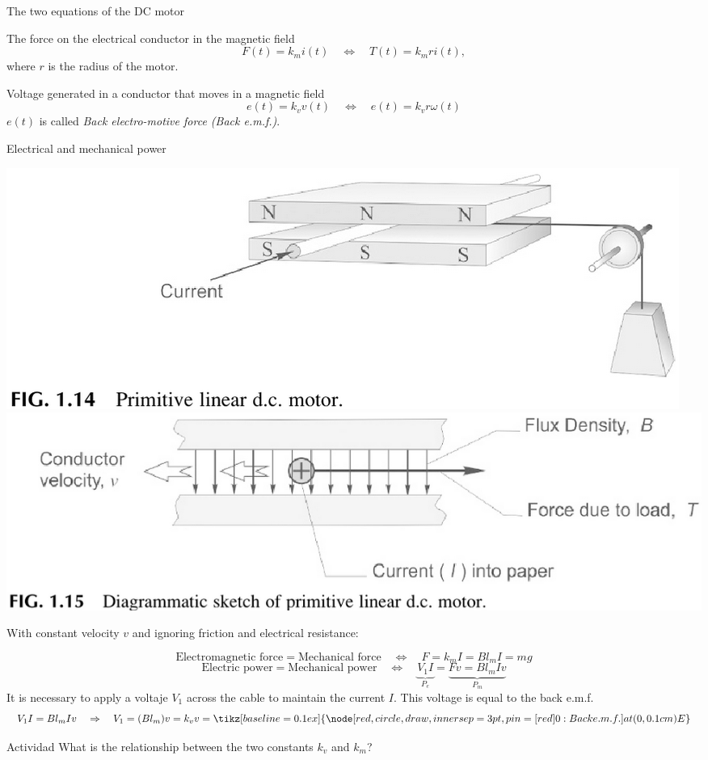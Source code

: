 \documentclass[presentation,aspectratio=169]{beamer}
\begin{document}
\begin{frame}[label={sec:org30e5cc4}]{The two equations of the DC motor}
\begin{block}{The force on the electrical conductor in the magnetic field}
\[ F(t) = k_m i(t) \quad\Leftrightarrow\quad T(t) = k_m r i(t),\]
where \(r\) is the radius of the motor.
\end{block}

\begin{block}{Voltage generated in a conductor that moves in a magnetic field}
\[ e(t) = k_v v(t) \quad\Leftrightarrow\quad e(t) = k_v r \omega(t)\]
\(e(t)\) is called  \emph{Back electro-motive force (Back e.m.f.)}.
\end{block}
\end{frame}

\begin{frame}[label={sec:org41407f8}]{Electrical and mechanical power}
\begin{center}
\includegraphics[width=0.4\linewidth]{../../figures/HD-fig1_14.png}
\includegraphics[width=0.53\linewidth]{../../figures/HD-fig1_15.png}
\end{center}

With constant velocity \(v\) and ignoring friction and electrical resistance: 

\[ \text{Electromagnetic force} = \text{Mechanical force} \quad\Leftrightarrow\quad F=k_mI =Bl_mI = mg\]
\[ \text{Electric power} = \text{Mechanical power} \quad \Leftrightarrow\quad \underbrace{V_1I}_{P_e} = \underbrace{Fv = Bl_mI v}_{P_m} \] 
It is necessary to apply a voltaje \(V_1\) across the cable to maintain the current \(I\). \alert{This voltage is equal to the back e.m.f.} 
\[ V_1I = Bl_mIv \quad \Rightarrow \quad V_1 = (Bl_m)v = k_v v = \tikz[baseline = 0.1ex]{\node[red, circle, draw, inner sep=3pt, pin={[red]0:{Back e.m.f.}}] at (0, 0.1 cm) {\textcolor{black}{E}}}\]

\alert{Actividad} What is the relationship between the two constants \(k_v\) and \(k_m\)?
\end{frame}
\end{document}
